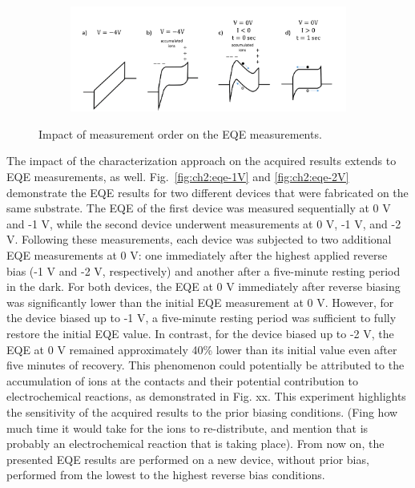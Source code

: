 \begin{figure}[htbp]
    
    \begin{subfigure}[t]{0.9\textwidth}
        \centering
        \includegraphics[width=\textwidth]{chapters/material_properties/images/ions.png} %
        \caption{}
        \label{}
    \end{subfigure}

    \caption{Impact of measurement order on the EQE measurements.}
    \label{fig:ch2:eqe}
\end{figure}

The impact of the characterization approach on the acquired results extends to EQE measurements, as well. Fig.~\ref{fig:ch2:eqe-1V} and \ref{fig:ch2:eqe-2V} demonstrate the EQE results for two different devices that were fabricated on the same substrate. The EQE of the first device was measured sequentially at 0 V and -1 V, while the second device underwent measurements at 0 V, -1 V, and -2 V. Following these measurements, each device was subjected to two additional EQE measurements at 0 V: one immediately after the highest applied reverse bias (-1 V and -2 V, respectively) and another after a five-minute resting period in the dark. For both devices, the EQE at 0 V immediately after reverse biasing was significantly lower than the initial EQE measurement at 0 V. However, for the device biased up to -1 V, a five-minute resting period was sufficient to fully restore the initial EQE value. In contrast, for the device biased up to -2 V, the EQE at 0 V remained approximately 40\% lower than its initial value even after five minutes of recovery. This phenomenon could potentially be attributed to the accumulation of ions at the contacts and their potential contribution to electrochemical reactions, as demonstrated in Fig. xx. This experiment highlights the sensitivity of the acquired results to the prior biasing conditions. (Fing how much time it would take for the ions to re-distribute, and mention that is probably an electrochemical reaction that is taking place). From now on, the presented EQE results are performed on a new device, without prior bias, performed from the lowest to the highest reverse bias conditions. 

